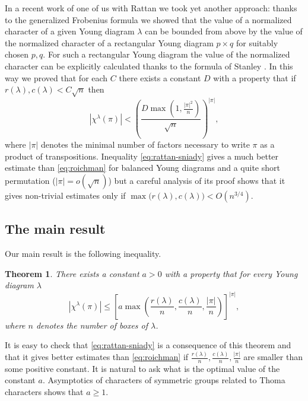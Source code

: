 \documentclass[12pt]{amsart}
\theoremstyle{plain}
\newtheorem{theorem}[lemma]{Theorem}
\theoremstyle{remark}
\newcommand{\balanced}{D}
\DeclareMathOperator{\supp}{supp}
\begin{document}
In a recent work of one of us with Rattan \cite{Rattan'Sniady2008} we
took yet another approach: thanks to the generalized Frobenius formula we showed
that the value of a normalized character of a given Young diagram $\lambda$ 
can be bounded from above by the value of the normalized character of a rectangular 
Young diagram $p\times q$ for suitably chosen $p,q$. For such a rectangular Young diagram
the value of the normalized character can be explicitly calculated thanks to
the formula of Stanley \cite{Stanley2003/04}. %
In this way we proved that for each $C$ there exists a constant $D$ with a property that 
if $r(\lambda),c(\lambda)< C \sqrt{n}$ then
\begin{equation}
\label{eq:rattan-sniady}
|\chi^{\lambda}(\pi)|< \left( \frac{D \max( 1, \frac{|\pi|^2}{n})}{\sqrt{n}} \right)^{|\pi|}, 
\end{equation}
where $|\pi|$ denotes the minimal number of factors necessary to write $\pi$ as a product of 
transpositions. Inequality \eqref{eq:rattan-sniady} gives a much better estimate 
than \eqref{eq:roichman} for balanced Young diagrams and a quite short
permutation ($|\pi|=o(\sqrt{n})$) but a careful analysis of its proof shows
that it gives non-trivial estimates only if 
$\max\big(r(\lambda),c(\lambda)\big) < O(n^{3/4})$.





\subsection{The main result}
Our main result is the following inequality.
\begin{theorem}
\label{theo:rough}
There exists a constant $a>0$ with a property that for every Young diagram $\lambda$
 $$ |\chi^{\lambda}(\pi)| \leq 
\left[a
\max\left(\frac{r(\lambda)}{n},\frac{c(\lambda)}{n},\frac{|\pi|}{n}
\right)\right]^{|\pi|}, $$
where $n$ denotes the number of boxes of $\lambda$.
\end{theorem}
It is easy to check that \eqref{eq:rattan-sniady} is a consequence of this theorem
and that it gives better estimates than \eqref{eq:roichman} if $\frac{r(\lambda)}{n},
\frac{c(\lambda)}{n},\frac{|\pi|}{n}$ are smaller than some positive
constant.
It is natural to ask what is the optimal value of the constant $a$. Asymptotics
of characters of symmetric groups related to Thoma characters shows that $a\geq 1$.
\end{document}

